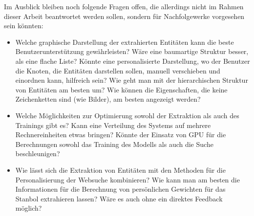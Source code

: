 Im Ausblick bleiben noch folgende Fragen offen, die allerdings nicht im Rahmen dieser Arbeit beantwortet werden sollen, sondern für Nachfolgewerke vorgesehen sein könnten:
\begin{itemize}
\item Welche graphische Darstellung der extrahierten Entitäten kann die beste Benutzerunterstützung gewährleisten? Wäre eine baumartige Struktur besser, als eine flache Liste? Könnte eine personalisierte Darstellung, wo der Benutzer die Knoten, die Entitäten darstellen sollen, manuell verschieben und einordnen kann, hilfreich sein? Wie geht man mit der hierarchischen Struktur von Entitäten am besten um? Wie können die Eigenschaften, die keine Zeichenketten sind (wie Bilder), am besten angezeigt werden?
\item Welche Möglichkeiten zur Optimierung sowohl der Extraktion als auch des Trainings gibt es? Kann eine Verteilung des Systems auf mehrere Rechnereinheiten etwas bringen? Könnte der Einsatz von GPU für die Berechnungen sowohl das Training des Modells als auch die Suche beschleunigen?
\item Wie lässt sich die Extraktion von Entitäten mit den Methoden für die Personalisierung der Websuche kombinieren? Wie kann man am besten die Informationen für die Berechnung von persönlichen Gewichten für das Stanbol extrahieren lassen? Wäre es auch ohne ein direktes Feedback möglich?
\end{itemize}